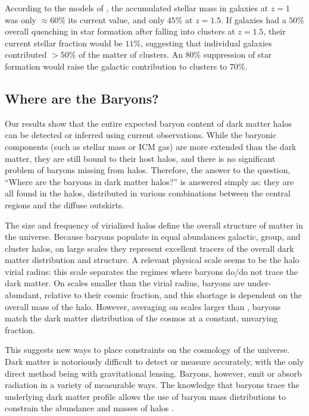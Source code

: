 According to the models of \citet{Hopkins2006}, the accumulated
stellar mass in galaxies at $z=1$ was only $\approx60\%$ its current
value, and only $45\%$ at $z=1.5$. If galaxies had a $50\%$ overall
quenching in star formation after falling into clusters at $z=1.5$,
their current stellar fraction would be $11\%$, suggesting that
individual galaxies contributed $>50\%$ of the matter of clusters. An
$80\%$ suppression of star formation would raise the galactic
contribution to clusters to $70\%$. 

\subsection{Where are the Baryons?}
\label{sec:Implications.Where}

Our results show that the entire expected baryon content of dark
matter halos can be detected or inferred using current
observations. While the baryonic components (such as stellar mass or
ICM gas) are more extended than the dark matter, they are still bound
to their host halos, and there is no significant problem of baryons
missing from halos. Therefore, the answer to the question, ``Where are
the baryons in dark matter halos?'' is answered simply as: they are
all found in the halos, distributed in various combinations between
the central regions and the diffuse outskirts. 

The size and frequency of virialized halos define the overall
structure of matter in the universe. Because baryons populate in equal
abundances galactic, group, and cluster halos, on large scales they
represent excellent tracers of the overall dark matter distribution
and structure. A relevant physical scale seems to be the halo virial
radius: this scale separates the regimes where baryons do/do not trace
the dark matter. On scales smaller than the virial radius, baryons are
under-abundant, relative to their cosmic fraction, and this shortage
is dependent on the overall mass of the halo. However, averaging on
scales larger than \rvir{}, baryons match the dark matter distribution
of the cosmos at a constant, unvarying fraction.

This suggests new ways to place constraints on the cosmology of the
universe. Dark matter is notoriously difficult to detect or measure
accurately, with the only direct method being with gravitational
lensing. Baryons, however, emit or absorb radiation in a variety of
measurable ways. The knowledge that baryons trace the underlying dark
matter profile allows the use of baryon mass distributions to
constrain the abundance and masses of halos .

